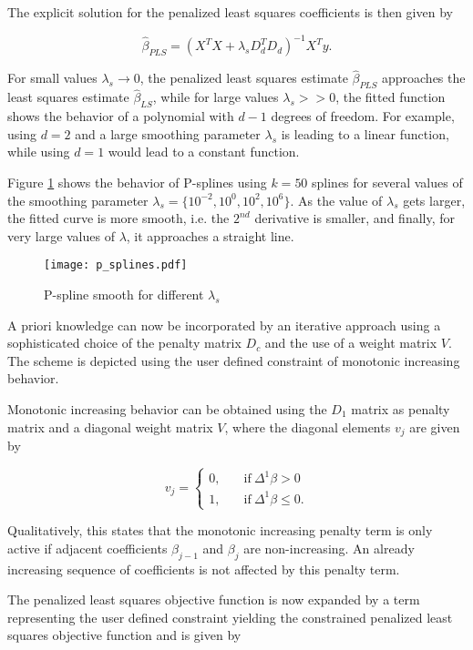 The explicit solution for the penalized least squares coefficients is then given by

$$\hat \beta_{PLS} = (X^TX + \lambda_s D_d^TD_d)^{-1} X^T y.$$

For small values $\lambda_s \rightarrow 0$, the penalized least squares estimate $\hat \beta_{PLS}$ approaches the least squares estimate $\hat \beta_{LS}$, while for large values $\lambda_s >> 0$, the fitted function shows the behavior of a polynomial with $d-1$ degrees of freedom. For example, using $d=2$ and a large smoothing parameter $\lambda_s$ is leading to a linear function, while using $d=1$ would lead to a constant function. \cite{fahrmeir2013regression}

Figure \ref{fig:pspline} shows the behavior of P-splines using $k=50$ splines for several values of the smoothing parameter $\lambda_s = \{10^{-2}, 10^{0},10^{2},10^{6}\}.$  As the value of $\lambda_s$ gets larger, the fitted curve is more smooth, i.e. the $2^{nd}$ derivative is smaller, and finally, for very large values of $\lambda$, it approaches a straight line.


\begin{figure}[H]
	\centering
	\texttt{[image: p\_splines.pdf]}
	\caption{P-spline smooth for different $\lambda_s$}
	\label{fig:pspline}
\end{figure}
		
A priori knowledge can now be incorporated by an iterative approach using a sophisticated choice of the penalty matrix $D_c$ and the use of a weight matrix $V$. The scheme is depicted using the user defined constraint of monotonic increasing behavior.  

Monotonic increasing behavior can be obtained using the $D_1$ matrix as penalty matrix and a diagonal weight matrix $V$, where the diagonal elements $v_j$ are given by

$$v_j = \begin{cases} 0, & \quad \text{if} \ \Delta^1 \beta > 0 \\ 
			  1, & \quad \text{if} \ \Delta^1 \beta \le 0.
	 	\end{cases}$$

Qualitatively, this states that the monotonic increasing penalty term is only active if adjacent coefficients $\beta_{j-1}$ and $\beta_j$ are non-increasing. An already increasing sequence of coefficients is not affected by this penalty term. \cite{hofner2011monotonicity}

The penalized least squares objective function is now expanded by a term representing the user defined constraint yielding the constrained penalized least squares objective function and is given by

